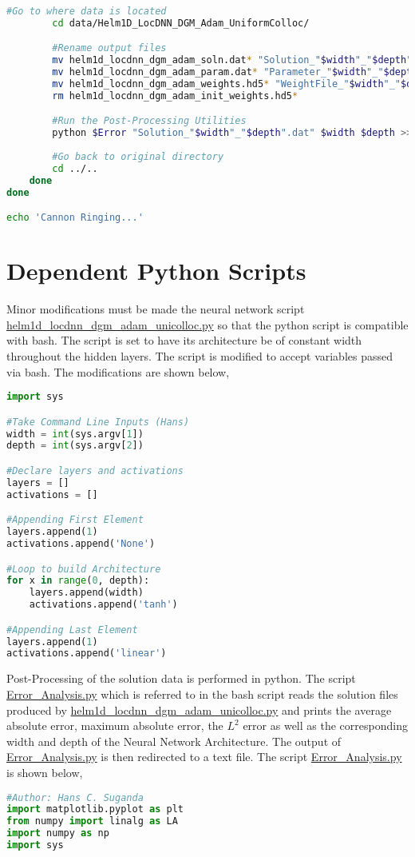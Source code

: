 \documentclass[a4paper, 12pt]{report}
\begin{document}
\begin{center}
\begin{lstlisting}[language=Bash]
        #Go to where data is located
        cd data/Helm1D_LocDNN_DGM_Adam_UniformColloc/

        #Rename output files 
        mv helm1d_locdnn_dgm_adam_soln.dat* "Solution_"$width"_"$depth".dat"
        mv helm1d_locdnn_dgm_adam_param.dat* "Parameter_"$width"_"$depth".dat"
        mv helm1d_locdnn_dgm_adam_weights.hd5* "WeightFile_"$width"_"$depth".dat"
        rm helm1d_locdnn_dgm_adam_init_weights.hd5*

        #Run the Post-Processing Utilities
        python $Error "Solution_"$width"_"$depth".dat" $width $depth >> NN_Architecture_Error.txt
        
        #Go back to original directory
        cd ../..
    done
done

echo 'Cannon Ringing...'
\end{lstlisting}
\section{Dependent Python Scripts}
\begin{comment}
\end{comment}
Minor modifications must be made the neural network script \url{helm1d_locdnn_dgm_adam_unicolloc.py} so that the python script is compatible with bash. The script is set to have its architecture be of constant width throughout the hidden layers. The script is modified to accept variables passed via bash. The modifications are shown below,
\begin{lstlisting}[language=python]
import sys

#Take Command Line Inputs (Hans)
width = int(sys.argv[1])
depth = int(sys.argv[2])

#Declare layers and activations
layers = [] 
activations = [] 

#Appending First Element
layers.append(1) 
activations.append('None') 

#Loop to build Architecture
for x in range(0, depth):
    layers.append(width)  
    activations.append('tanh')

#Appending Last Element
layers.append(1) 
activations.append('linear')
\end{lstlisting}
$$$$
Post-Processing of the solution data is performed in python. The script \url{Error_Analysis.py} which is referred to in the bash script reads the solution files produced by \url{helm1d_locdnn_dgm_adam_unicolloc.py} and prints the average absolute error, maximum absolute error, the $L^2$ error as well as the corresponding width and depth of the Neural Network Architecture. The output of \url{Error_Analysis.py} is then redirected to a text file. The script \url{Error_Analysis.py} is shown below,
\begin{lstlisting}[language=python]
#Author: Hans C. Suganda
import matplotlib.pyplot as plt
from numpy import linalg as LA
import numpy as np
import sys


\end{lstlisting}
\end{center}
\end{document}
